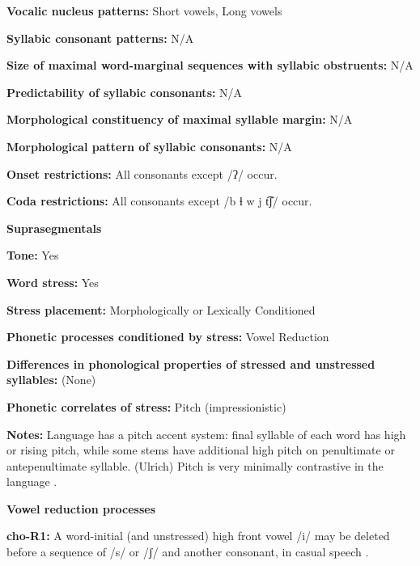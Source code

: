 \textbf{Vocalic nucleus patterns:} Short vowels, Long vowels



\textbf{Syllabic consonant patterns:} N/A



\textbf{Size of maximal word{}-marginal sequences with syllabic obstruents:} N/A



\textbf{Predictability of syllabic consonants:} N/A



\textbf{Morphological constituency of maximal syllable margin:} N/A



\textbf{Morphological pattern of syllabic consonants:} N/A



\textbf{Onset restrictions:} All consonants except /ʔ/ occur.



\textbf{Coda restrictions:} All consonants except /b ɬ w j t͡ʃ/ occur.



\textbf{Suprasegmentals}



\textbf{Tone:} Yes



\textbf{Word stress:} Yes



\textbf{Stress placement:} Morphologically or Lexically Conditioned



\textbf{Phonetic processes conditioned by stress:} Vowel Reduction



\textbf{Differences in phonological properties of stressed and unstressed syllables:} (None)



\textbf{Phonetic correlates of stress:} Pitch (impressionistic)



\textbf{Notes:} Language has a pitch accent system: final syllable of each word has high or rising pitch, while some stems have additional high pitch on penultimate or antepenultimate syllable. (Ulrich) Pitch is very minimally contrastive in the language \citep[17]{Broadwell2006}.



\textbf{Vowel reduction processes}



\textbf{cho-R1:} A word-initial (and unstressed) high front vowel /i/ may be deleted before a sequence of /s/ or /ʃ/ and another consonant, in casual speech \citep[19]{Broadwell2006}.



